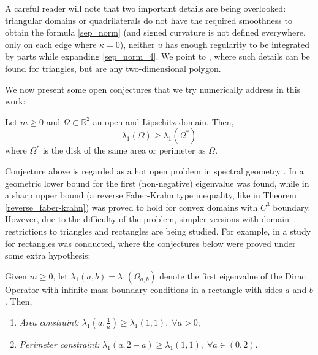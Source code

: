\begin{remark}
    A careful reader will note that two important details are being overlooked: triangular domains or quadrilaterals do not have the required smoothness to obtain the formula \eqref{sep_norm} (and signed curvature is not defined everywhere, only on each edge where \(\kappa=0\)), neither \(u\) has enough regularity to be integrated by parts while expanding \eqref{sep_norm_4}. We point to \cite{vu2023spectral}, where such details can be found for triangles, but are any two-dimensional polygon.
\end{remark}

We now present some open conjectures that we try numerically address in this work:

\begin{conjecture}
    Let \(m \geq 0\) and \(\Omega \subset \mathbb{R}^2\) an open and Lipschitz domain. Then,
    \[
    \lambda_1(\Omega) \geq \lambda_1(\Omega^\ast)
    \]
    where \(\Omega^\ast\) is the disk of the same area or perimeter as \(\Omega\).
\end{conjecture}
Conjecture above is regarded as a hot open problem in spectral geometry \cite{krejcirik_larson_lotoreichik_2019}. In \cite{benguria2017spectral} a geometric lower bound for the first (non-negative) eigenvalue was found, while in \cite{lotoreichik2019sharp} a sharp upper bound (a reverse Faber-Krahn type inequality, like in Theorem \ref*{reverse_faber-krahn}) was proved to hold for convex domains with \(C^3\) boundary. However, due to the difficulty of the problem, simpler versions with domain restrictions to triangles and rectangles are being studied. For example, in \cite{briet2022spectral} a study for rectangles was conducted, where the conjectures below were proved under some extra hypothesis:
\begin{conjecture}\label{david_conjectures}
    Given \(m \geq 0\), let \(\lambda_1(a, b) = \lambda_1(\Omega_{a, b})\) denote the first eigenvalue of the Dirac Operator with infinite-mass boundary conditions in a rectangle with sides \(a\) and \(b\). Then,
    \begin{enumerate}
        \item \textit{Area constraint: } \(\lambda_1(a, \frac{1}{a}) \geq \lambda_1(1, 1), \; \forall a>0 \);
        \item \textit{Perimeter constraint: } \(\lambda_1(a, 2-a) \geq \lambda_1(1, 1), \; \forall a\in (0, 2)\).
    \end{enumerate}
\end{conjecture}
